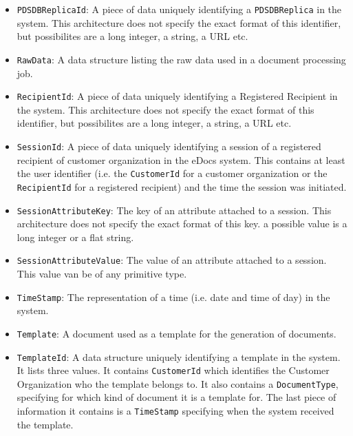\documentclass[a4paper,10pt]{article}
\begin{document}
\begin{itemize}
    \item \texttt{PDSDBReplicaId}:  A piece of data uniquely identifying a \texttt{PDSDBReplica} in the system. This architecture does not specify the exact format of this identifier, but possibilites are a long integer, a string, a URL etc.
    
    \item \texttt{RawData}: A data structure listing the raw data used in a document processing job.
    
    \item \texttt{RecipientId}: A piece of data uniquely identifying a Registered Recipient in the system. This architecture does not specify the exact format of this identifier, but possibilites are a long integer, a string, a URL etc.
    
    \item \texttt{SessionId}: A piece of data uniquely identifying a session of a registered recipient of customer organization in the eDocs system. This contains at least the user identifier (i.e. the \texttt{CustomerId} for a customer organization or the \texttt{RecipientId} for a registered recipient) and the time the session was initiated.
    
    \item \texttt{SessionAttributeKey}: The key of an attribute attached to a session. This architecture does not specify the exact format of this key. a possible value is a long integer or a flat string.
    
    \item \texttt{SessionAttributeValue}: The value of an attribute attached to a session. This value van be of any primitive type.
    
    \item \texttt{TimeStamp}: The representation of a time (i.e. date and time of day) in the system.
    
    \item \texttt{Template}: A document used as a template for the generation of documents.
    
    \item \texttt{TemplateId}: A data structure uniquely identifying a template in the system. It lists three values. It contains \texttt{CustomerId} which identifies the Customer Organization who the template belongs to. It also contains a \texttt{DocumentType}, specifying for which kind of document it is a template for. The last piece of information it contains is a \texttt{TimeStamp} specifying when the system received the template.
\end{itemize}
\end{document}
